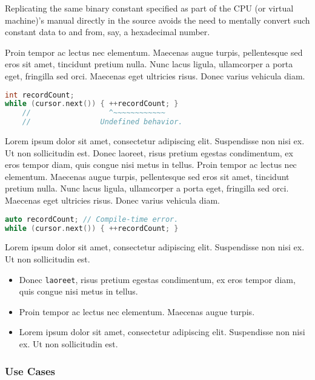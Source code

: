 \documentclass[twoside,10pt,letterpaper,usenames]{newstyle-PearsonGeneric-7-38}
\let\Begin\begin
\let\End\end
\begin{document}
Replicating the same binary constant specified as part of the CPU (or
virtual machine)'s manual directly in the source avoids the need to
mentally convert such constant data to and from, say, a hexadecimal
number.

\Begin{leftbar}

Proin tempor ac lectus nec elementum. Maecenas augue turpis,
pellentesque sed eros sit amet, tincidunt pretium nulla. Nunc lacus
ligula, ullamcorper a porta eget, fringilla sed orci. Maecenas eget
ultricies risus. Donec varius vehicula diam.

\begin{lstlisting}[language=C++]
int recordCount;
while (cursor.next()) { ++recordCount; }
    //                  ^~~~~~~~~~~~~
    //                Undefined behavior.
\end{lstlisting}
    

\End{leftbar}

Lorem ipsum dolor sit amet, consectetur adipiscing elit. Suspendisse non
nisi ex. Ut non sollicitudin est. Donec laoreet, risus pretium egestas
condimentum, ex eros tempor diam, quis congue nisi metus in tellus.
Proin tempor ac lectus nec elementum. Maecenas augue turpis,
pellentesque sed eros sit amet, tincidunt pretium nulla. Nunc lacus
ligula, ullamcorper a porta eget, fringilla sed orci. Maecenas eget
ultricies risus. Donec varius vehicula diam.

\begin{lstlisting}[language=C++]
auto recordCount; // Compile-time error.
while (cursor.next()) { ++recordCount; }
\end{lstlisting}
    

Lorem ipsum dolor sit amet, consectetur adipiscing elit. Suspendisse non
nisi ex. Ut non sollicitudin est.

\begin{itemize}
\item{Donec \texttt{laoreet}, risus pretium egestas condimentum, ex eros tempor diam, quis congue nisi metus in tellus.}
\item{Proin tempor ac lectus nec elementum. Maecenas augue turpis.}
\item{Lorem ipsum dolor sit amet, consectetur adipiscing elit. Suspendisse non nisi ex. Ut non sollicitudin est.}
\end{itemize}

\subsubsection[Use Cases]{Use Cases}\label{use-cases}
\end{document}
